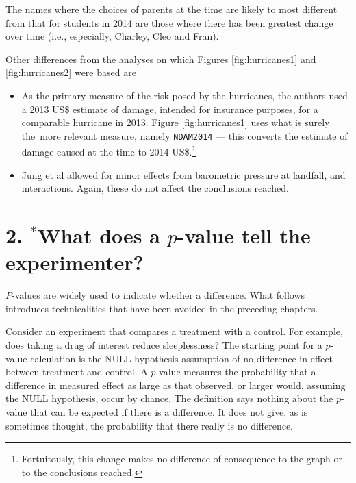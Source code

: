 \documentclass[
  10pt,
  b5paper]{book}
\providecommand{\tightlist}{%
  \setlength{\itemsep}{0pt}\setlength{\parskip}{0pt}}
\begin{document}
The names where the choices of parents at the time are likely to most different from that for students in 2014 are those where there has been greatest change over time (i.e., especially, Charley, Cleo and Fran).

\enlargethispage{21pt}

Other differences from the analyses on which Figures \ref{fig:hurricanes1} and \ref{fig:hurricanes2} were based are

\begin{itemize}
\tightlist
\item
  As the primary measure of the risk posed by the hurricanes, the authors used a 2013 US\$ estimate of damage, intended for insurance purposes, for a comparable hurricane in 2013. Figure \ref{fig:hurricanes1} uses what is surely the~more relevant measure, namely \texttt{NDAM2014} --- this converts the estimate of damage caused at the time to 2014 US\$.\footnote{Fortuitously, this change makes no difference of consequence to the graph or to the conclusions reached.}
\item
  Jung et al allowed for minor effects from barometric pressure at landfall, and interactions. Again, these do not affect the conclusions reached.
\end{itemize}

\hypertarget{pval}{%
\section*{\texorpdfstring{2. \(^*\)What does a \(p\)-value tell the experimenter?}{2. \^{}*What does a p-value tell the experimenter?}}\label{pval}}

\(P\)-values are widely used to indicate whether a difference. What follows introduces technicalities that have been avoided in the preceding chapters.

Consider an experiment that compares a treatment with a control. For example, does taking a drug of interest reduce sleeplessness? The starting point for a \(p\)-value calculation is the NULL hypothesis assumption of no difference in effect between treatment and control. A \(p\)-value measures the probability that a difference in measured effect as large as that observed, or larger would, assuming the NULL hypothesis, occur by chance. The definition says nothing about the \(p\)-value that can be expected if there is a difference. It does not give, as is sometimes thought, the probability that there really is no difference.
\end{document}
